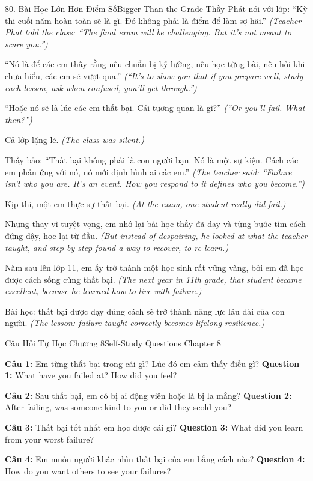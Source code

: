 \begin{truyen}{80. Bài Học Lớn Hơn Điểm Số}{Bigger Than the Grade}
Thầy Phát nói với lớp: ``Kỳ thi cuối năm hoàn toàn sẽ là gì. Đó không phải là điểm để làm sợ hãi.''
\textit{(Teacher Phat told the class: ``The final exam will be challenging. But it's not meant to scare you.'')}

``Nó là để các em thấy rằng nếu chuẩn bị kỹ lưỡng, nếu học từng bài, nếu hỏi khi chưa hiểu, các em sẽ vượt qua.''
\textit{(``It's to show you that if you prepare well, study each lesson, ask when confused, you'll get through.'')}

``Hoặc nó sẽ là lúc các em thất bại. Cái tương quan là gì?''
\textit{(``Or you'll fail. What then?'')}

Cả lớp lặng lẽ.
\textit{(The class was silent.)}

Thầy bảo: ``Thất bại không phải là con người bạn. Nó là một sự kiện. Cách các em phản ứng với nó, nó mới định hình ai các em.''
\textit{(The teacher said: ``Failure isn't who you are. It's an event. How you respond to it defines who you become.'')}

Kịp thi, một em thực sự thất bại.
\textit{(At the exam, one student really did fail.)}

Nhưng thay vì tuyệt vọng, em nhớ lại bài học thầy đã dạy và từng bước tìm cách đứng dậy, học lại từ đầu.
\textit{(But instead of despairing, he looked at what the teacher taught, and step by step found a way to recover, to re-learn.)}

Năm sau lên lớp 11, em ấy trở thành một học sinh rất vững vàng, bởi em đã học được cách sống cùng thất bại.
\textit{(The next year in 11th grade, that student became excellent, because he learned how to live with failure.)}

Bài học: thất bại được dạy đúng cách sẽ trở thành năng lực lâu dài của con người.
\textit{(The lesson: failure taught correctly becomes lifelong resilience.)}
\end{truyen}

\begin{tuhocnhanh}{Câu Hỏi Tự Học Chương 8}{Self-Study Questions Chapter 8}

\textbf{Câu 1:} Em từng thất bại trong cái gì? Lúc đó em cảm thấy điều gì?
\textbf{Question 1:} What have you failed at? How did you feel?

\textbf{Câu 2:} Sau thất bại, em có bị ai động viên hoặc là bị la mắng?
\textbf{Question 2:} After failing, was someone kind to you or did they scold you?

\textbf{Câu 3:} Thất bại tốt nhất em học được cái gì?
\textbf{Question 3:} What did you learn from your worst failure?

\textbf{Câu 4:} Em muốn người khác nhìn thất bại của em bằng cách nào?
\textbf{Question 4:} How do you want others to see your failures?

\end{tuhocnhanh}
